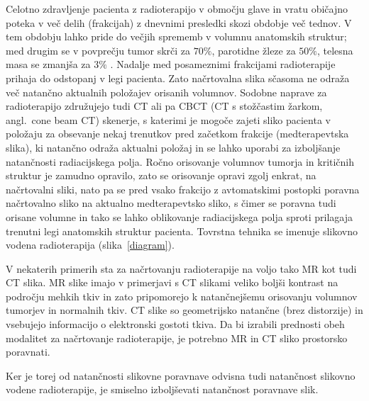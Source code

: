 \documentclass[journal]{IEEEtran}
\begin{document}
Celotno zdravljenje pacienta z radioterapijo v območju glave in vratu običajno poteka v več delih (frakcijah) z dnevnimi presledki skozi obdobje več tednov. V tem obdobju lahko pride do večjih sprememb v volumnu anatomskih struktur; med drugim se v povprečju tumor skrči za $70\%$, parotidne žleze za $50\%$, telesna masa se zmanjša za $3\%$ \cite{al-mayah2015}. Nadalje med posameznimi frakcijami radioterapije prihaja do odstopanj v legi pacienta. Zato načrtovalna slika sčasoma ne odraža več natančno aktualnih položajev orisanih volumnov. Sodobne naprave za radioterapijo združujejo tudi CT ali pa CBCT (CT s stožčastim žarkom, angl.~cone beam CT) skenerje, s katerimi je mogoče zajeti sliko pacienta v položaju za obsevanje nekaj trenutkov pred začetkom frakcije (medterapevtska slika), ki natančno odraža aktualni položaj in se lahko uporabi za izboljšanje natančnosti radiacijskega polja. Ročno orisovanje volumnov tumorja in kritičnih struktur je zamudno opravilo, zato se orisovanje opravi zgolj enkrat, na načrtovalni sliki, nato pa se pred vsako frakcijo z avtomatskimi postopki poravna načrtovalno sliko na aktualno medterapevtsko sliko, s čimer se poravna tudi orisane volumne in tako se lahko oblikovanje radiacijskega polja sproti prilagaja trenutni legi anatomskih struktur pacienta. Tovrstna tehnika se imenuje slikovno vodena radioterapija (slika~\ref{diagram}).

V nekaterih primerih sta za načrtovanju radioterapije na voljo tako MR kot tudi CT slika. MR slike imajo v primerjavi s CT slikami veliko boljši kontrast na področju mehkih tkiv in zato pripomorejo k natančnejšemu orisovanju volumnov tumorjev in normalnih tkiv. CT slike so geometrijsko natančne (brez distorzije) in vsebujejo informacijo o elektronski gostoti tkiva. Da bi izrabili prednosti obeh modalitet za načrtovanje radioterapije, je potrebno MR in CT sliko prostorsko poravnati.

Ker je torej od natančnosti slikovne poravnave odvisna tudi natančnost slikovno vodene radioterapije, je smiselno izboljševati natančnost poravnave slik.
\end{document}

